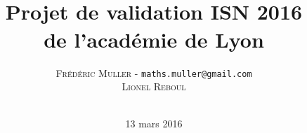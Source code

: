 


\lfoot[\thepage]{}
\rfoot[]{\thepage}




\title{\\ \medskip \medskip \large{Projet de validation ISN 2016\\de l'académie de Lyon}}
\author{\textsc{Frédéric Muller} - \texttt{maths.muller@gmail.com}\\ \textsc{Lionel Reboul}\\ \\
   }
\date{13 mars 2016}

\maketitle


\clearpage{\pagestyle{empty}\cleardoublepage}
\setcounter{tocdepth}{1}
\tableofcontents
\thispagestyle{fancy}















